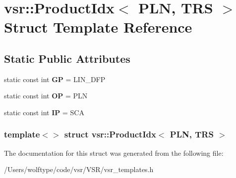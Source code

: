 \hypertarget{structvsr_1_1_product_idx_3_01_p_l_n_00_01_t_r_s_01_4}{\section{vsr\-:\-:Product\-Idx$<$ P\-L\-N, T\-R\-S $>$ Struct Template Reference}
\label{structvsr_1_1_product_idx_3_01_p_l_n_00_01_t_r_s_01_4}
}
\subsection*{Static Public Attributes}
\begin{DoxyCompactItemize}
\item 
\hypertarget{structvsr_1_1_product_idx_3_01_p_l_n_00_01_t_r_s_01_4_a43c5a77bc799627d8eb22f21708410ba}{static const int {\bfseries G\-P} = L\-I\-N\-\_\-\-D\-F\-P}\label{structvsr_1_1_product_idx_3_01_p_l_n_00_01_t_r_s_01_4_a43c5a77bc799627d8eb22f21708410ba}

\item 
\hypertarget{structvsr_1_1_product_idx_3_01_p_l_n_00_01_t_r_s_01_4_a62ba66fd7d939fd1ee7d93f5b7488e87}{static const int {\bfseries O\-P} = P\-L\-N}\label{structvsr_1_1_product_idx_3_01_p_l_n_00_01_t_r_s_01_4_a62ba66fd7d939fd1ee7d93f5b7488e87}

\item 
\hypertarget{structvsr_1_1_product_idx_3_01_p_l_n_00_01_t_r_s_01_4_a56921610ab8ca22d9f7f7d1a72418bbe}{static const int {\bfseries I\-P} = S\-C\-A}\label{structvsr_1_1_product_idx_3_01_p_l_n_00_01_t_r_s_01_4_a56921610ab8ca22d9f7f7d1a72418bbe}

\end{DoxyCompactItemize}
\subsubsection*{template$<$$>$ struct vsr\-::\-Product\-Idx$<$ P\-L\-N, T\-R\-S $>$}



The documentation for this struct was generated from the following file\-:\begin{DoxyCompactItemize}
\item 
/\-Users/wolftype/code/vsr/\-V\-S\-R/vsr\-\_\-templates.\-h\end{DoxyCompactItemize}
